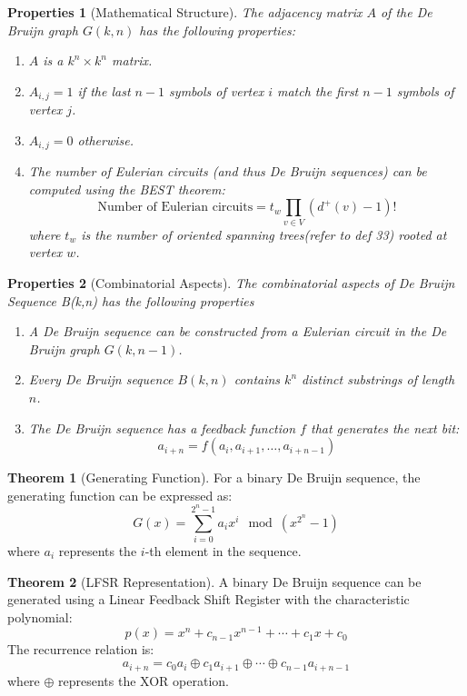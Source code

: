 \documentclass{article}
\newtheorem{properties}{Properties}
\theoremstyle{definition}
\newtheorem{theorem}{Theorem}
\begin{document}
\begin{properties}[Mathematical Structure]
The adjacency matrix $A$ of the De Bruijn graph $G(k, n)$ has the following properties:
\begin{enumerate}
    \item $A$ is a $k^n \times k^n$ matrix.
    \item $A_{i,j} = 1$ if the last $n-1$ symbols of vertex $i$ match the first $n-1$ symbols of vertex $j$.
    \item $A_{i,j} = 0$ otherwise.
    \item The number of Eulerian circuits (and thus De Bruijn sequences) can be computed using the BEST theorem:
    \begin{equation}
        \text{Number of Eulerian circuits} = t_w \prod_{v \in V} (d^+(v) - 1)!
    \end{equation}
    where $t_w$ is the number of oriented spanning trees(refer to def 33) rooted at vertex $w$.
\end{enumerate}
\end{properties}

\begin{properties}[Combinatorial Aspects] The combinatorial aspects of De Bruijn Sequence B(k,n) has the following properties
\begin{enumerate}
    \item A De Bruijn sequence can be constructed from a Eulerian circuit in the De Bruijn graph $G(k, n-1)$.
    \item Every De Bruijn sequence $B(k, n)$ contains $k^n$ distinct substrings of length $n$.
    \item The De Bruijn sequence has a feedback function $f$ that generates the next bit:
    \begin{equation}
        a_{i+n} = f(a_i, a_{i+1}, \ldots, a_{i+n-1})
    \end{equation}
\end{enumerate}
\end{properties}
\begin{theorem}[Generating Function]
For a binary De Bruijn sequence, the generating function can be expressed as:
\begin{equation}
    G(x) = \sum_{i=0}^{2^n-1} a_i x^i \mod (x^{2^n} - 1)
\end{equation}
where $a_i$ represents the $i$-th element in the sequence.
\end{theorem}

\begin{theorem}[LFSR Representation]
A binary De Bruijn sequence can be generated using a Linear Feedback Shift Register with the characteristic polynomial:
\begin{equation}
    p(x) = x^n + c_{n-1}x^{n-1} + \cdots + c_1x + c_0
\end{equation}
The recurrence relation is:
\begin{equation}
    a_{i+n} = c_0a_i \oplus c_1a_{i+1} \oplus \cdots \oplus c_{n-1}a_{i+n-1}
\end{equation}
where $\oplus$ represents the XOR operation.
\end{theorem}
\end{document}
